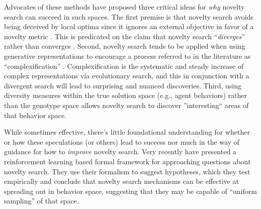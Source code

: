 \documentclass[twoside]{article}
\begin{document}
Advocates of these methods have proposed three critical ideas for \emph{why} novelty search can succeed in such spaces.  The first premise is that novelty search avoids being deceived by local optima since it ignores an external objective in favor of a novelty metric \citep{Lehman2011ecj}.  This is predicated on the claim that novelty search ``\emph{diverges}'' rather than converges \citet{Lehman2016frai,Lehman2015gecco,StanleyLehman2015}.  Second, novelty search tends to be applied when using generative representations \citep{LehmanStanley2008ssls} to encourage a process referred to in the literature as ``complexification'' \citep{StanleyMiikkulainen2004jair}.  Complexification is the systematic and steady increase of complex representations via evolutionary search, and this in conjunction with a divergent search will lead to surprising and nuanced discoveries.  Third, using diversity measures within the true solution space (e.g., agent behaviors) rather than the genotype space allows novelty search to discover ''interesting`` areas of that behavior space.  

While sometimes effective, there's little foundational understanding for whether or how these speculations (or others) lead to success nor much in the way of guidance for how to \emph{improve} novelty search.  Very recently \citet{Doncieux2020gecco,Doncieux2019gecco} have presented a reinforcement learning based formal framework for approaching questions about novelty search.  They use their formalism to suggest hypotheses, which they test empirically and conclude that novelty search mechanisms can be effective at spreading out in behavior space, suggesting that they may be capable of ``uniform sampling'' of that space.   

\end{document}
